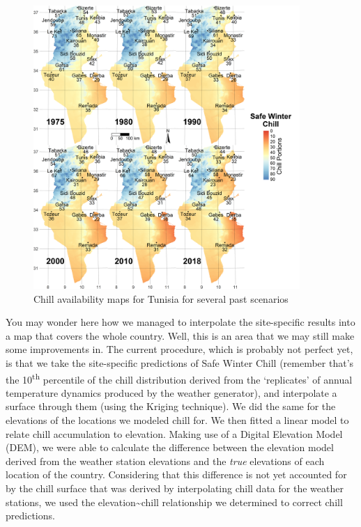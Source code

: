 \documentclass[
]{book}
\begin{document}
\begin{figure}
\centering
\includegraphics[width=0.9\textwidth,height=\textheight]{pictures/Figure_1_Tunisia_historic.png}
\caption{Chill availability maps for Tunisia for several past scenarios}
\end{figure}

You may wonder here how we managed to interpolate the site-specific results into a map that covers the whole country. Well, this is an area that we may still make some improvements in. The current procedure, which is probably not perfect yet, is that we take the site-specific predictions of Safe Winter Chill (remember that's the 10\textsuperscript{th} percentile of the chill distribution derived from the `replicates' of annual temperature dynamics produced by the weather generator), and interpolate a surface through them (using the Kriging technique). We did the same for the elevations of the locations we modeled chill for. We then fitted a linear model to relate chill accumulation to elevation. Making use of a Digital Elevation Model (DEM), we were able to calculate the difference between the elevation model derived from the weather station elevations and the \emph{true} elevations of each location of the country. Considering that this difference is not yet accounted for by the chill surface that was derived by interpolating chill data for the weather stations, we used the elevation\textasciitilde chill relationship we determined to correct chill predictions.
\end{document}
